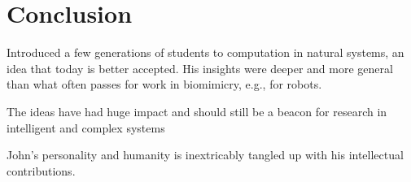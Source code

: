 \documentclass{sig-alternate}
\begin{document}
\section{Conclusion}

Introduced a few generations of students to computation in natural systems, an idea that today is better accepted.  His insights were deeper and more general than what often passes for work in biomimicry, e.g., for robots.

The ideas have had huge impact and should still be a beacon for research in intelligent and complex systems

John's personality and humanity is inextricably tangled up with his intellectual contributions.




\end{document}

